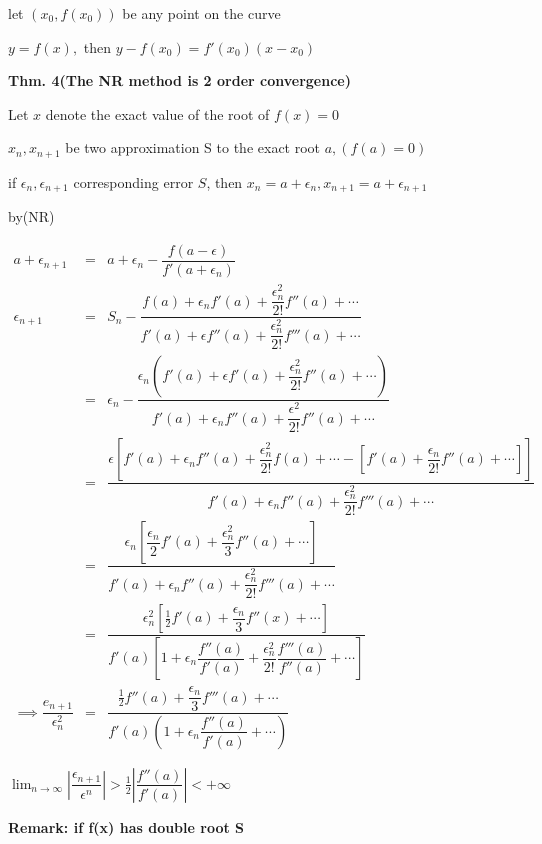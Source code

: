 let $(x_0,f(x_0))$ be any point on the curve

$y = f(x),$ then $y-f(x_0) = f'(x_0)(x-x_0)$

\textbf{Thm. 4(The NR method is 2 order convergence)}

\begin{tcolorbox}
	Let $x$ denote the exact value of the root of $f(x) = 0$
	
	$x_n,x_{n+1}$ be two approximation S to the exact root $a,(f(a) = 0)$
	
	if $\epsilon_n,\epsilon_{n+1}$ corresponding error $S$, then $x_n = a + \epsilon_n, x_{n+1} = a + \epsilon_{n+1}$
	
	by(NR)
	
	\begin{eqnarray*}
		a + \epsilon_{n+1} &=& a + \epsilon_n - \dfrac{f(a-\epsilon)}{f'(a+\epsilon_n)} 
		\\
		\epsilon_{n+1} &=& S_n - \dfrac{f(a)+\epsilon_nf'(a)+\dfrac{\epsilon_n^2}{2!}f''(a)+\cdots}{f'(a)+\epsilon f''(a)+\dfrac{\epsilon_n^2}{2!}f'''(a)+\cdots}
		\\
		&=&\epsilon_n - \dfrac{\epsilon_n\left(f'(a)+\epsilon f'(a)+\dfrac{\epsilon_n^2}{2!}f''(a)+\cdots\right)}{f'(a)+\epsilon_n f''(a) + \dfrac{\epsilon^2}{2!}f''(a)+\cdots}
		\\
		&=&\dfrac{\epsilon[f'(a)+\epsilon_nf''(a)+\dfrac{\epsilon_n^2}{2!}f(a)+\cdots-[f'(a)+\dfrac{\epsilon_n}{2!}f''(a)+\cdots]]}{f'(a)+\epsilon_nf''(a)+\dfrac{\epsilon_n^2}{2!}f'''(a)+\cdots}
		\\
		&=&\dfrac{\epsilon_n[\dfrac{\epsilon_n}{2}f'(a)+\dfrac{\epsilon^2_n}{3}f''(a)+\cdots]}{f'(a)+\epsilon_n f''(a)+\dfrac{\epsilon^2_n}{2!}f'''(a)+\cdots}
		\\
		&=&\dfrac{\epsilon_n^2[\frac{1}{2}f'(a)+\dfrac{\epsilon_n}{3}f''(x)+\cdots]}{f'(a)[1+\epsilon_n\dfrac{f''(a)}{f'(a)}+\dfrac{\epsilon_n^2}{2!}\dfrac{f'''(a)}{f''(a)}+\cdots]}
		\\
		\implies \dfrac{e_{n+1}}{\epsilon_n^2} &=& \dfrac{\frac{1}{2}f''(a)+\dfrac{\epsilon_n}{3}f'''(a) + \cdots}{f'(a)(1+\epsilon_n\dfrac{f''(a)}{f'(a)}+\cdots)}
	\end{eqnarray*}
	
	$\lim_{n \rightarrow \infty}|\dfrac{\epsilon_{n+1}}{\epsilon^n}| > \frac{1}{2}|\dfrac{f''(a)}{f'(a)}| < + \infty$
	
	\textbf{Remark: if f(x) has double root S}
	
	
\end{tcolorbox}

